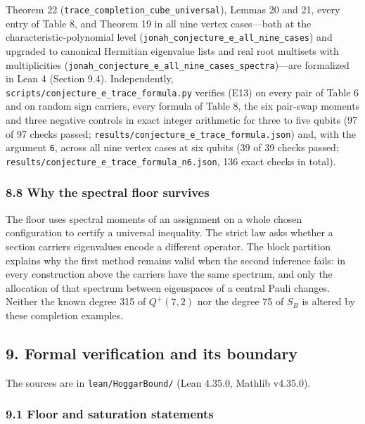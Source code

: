 \documentclass[11pt,a4paper]{article}
\begin{document}
Theorem 22 (\nolinkurl{trace_completion_cube_universal}), Lemmas 20 and 21, every entry of Table 8, and Theorem 19
in all nine vertex cases---both at the characteristic-polynomial level (\nolinkurl{jonah_conjecture_e_all_nine_cases})
and upgraded to canonical Hermitian eigenvalue lists and real root multisets with multiplicities
(\nolinkurl{jonah_conjecture_e_all_nine_cases_spectra})---are formalized in Lean 4 (Section 9.4). Independently,
\nolinkurl{scripts/conjecture_e_trace_formula.py} verifies (E13) on every pair of Table 6 and on random sign
carriers, every formula of Table 8, the six pair-swap moments and three negative controls in exact integer
arithmetic for three to five qubits (97 of 97 checks passed; \nolinkurl{results/conjecture_e_trace_formula.json})
and, with the argument \texttt{6}, across all nine vertex cases at six qubits (39 of 39 checks passed;
\nolinkurl{results/conjecture_e_trace_formula_n6.json}, 136 exact checks in total).

\subsubsection{8.8 Why the spectral floor survives}\label{88-why-the-spectral-floor-survives}

The floor uses spectral moments of an assignment on a whole chosen configuration to certify a
universal inequality. The strict law asks whether a section carrier\textquotesingle s eigenvalues encode a different
operator. The block partition explains why the first method remains valid when the second inference
fails: in every construction above the carriers have the same spectrum, and only the allocation of
that spectrum between eigenspaces of a central Pauli changes. Neither the known degree 315 of
\(Q^+(7,2)\) nor the degree 75 of \(S_B\) is altered by these completion examples.

\subsection{9. Formal verification and its boundary}\label{9-formal-verification-and-its-boundary}

The sources are in \texttt{lean/HoggarBound/} (Lean 4.35.0, Mathlib v4.35.0).

\subsubsection{9.1 Floor and saturation statements}\label{91-floor-and-saturation-statements}
\end{document}
